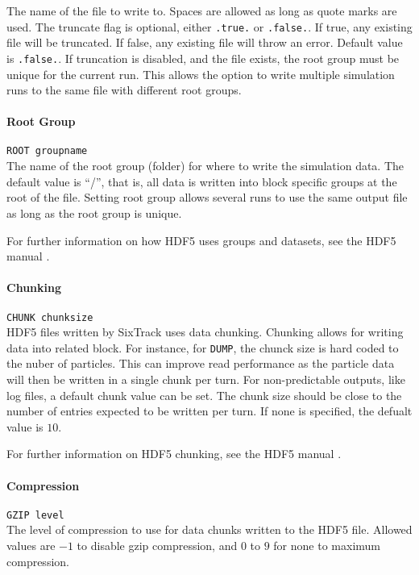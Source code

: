 The name of the file to write to.
Spaces are allowed as long as quote marks are used.
The truncate flag is optional, either \texttt{.true.} or \texttt{.false.}.
If true, any existing file will be truncated.
If false, any existing file will throw an error.
Default value is \texttt{.false.}.
If truncation is disabled, and the file exists, the root group must be unique for the current run.
This allows the option to write multiple simulation runs to the same file with different root groups.

\paragraph{Root Group} \texttt{ROOT groupname}\\

The name of the root group (folder) for where to write the simulation data.
The default value is ``/'', that is, all data is written into block specific groups at the root of the file.
Setting root group allows several runs to use the same output file as long as the root group is unique.

For further information on how HDF5 uses groups and datasets, see the HDF5 manual \cite{h5_doc}.

\paragraph{Chunking} \texttt{CHUNK chunksize}\\

HDF5 files written by SixTrack uses data chunking.
Chunking allows for writing data into related block.
For instance, for \texttt{DUMP}, the chunck size is hard coded to the nuber of particles.
This can improve read performance as the particle data will then be written in a single chunk per turn.
For non-predictable outputs, like log files, a default chunk value can be set.
The chunk size should be close to the number of entries expected to be written per turn.
If none is specified, the defualt value is $10$.

For further information on HDF5 chunking, see the HDF5 manual \cite{h5_doc}.

\paragraph{Compression} \texttt{GZIP level}\\

The level of compression to use for data chunks written to the HDF5 file.
Allowed values are $-1$ to disable gzip compression, and $0$ to $9$ for none to maximum compression.

